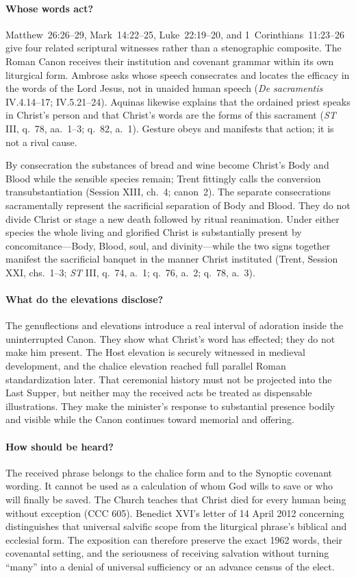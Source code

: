 \paragraph{Whose words act?}
Matthew~26:26--29, Mark~14:22--25, Luke~22:19--20, and 1~Corinthians~11:23--26 give four related scriptural witnesses rather than a stenographic composite. The Roman Canon receives their institution and covenant grammar within its own liturgical form. Ambrose asks whose speech consecrates and locates the efficacy in the words of the Lord Jesus, not in unaided human speech (\emph{De sacramentis} IV.4.14--17; IV.5.21--24). Aquinas likewise explains that the ordained priest speaks in Christ's person and that Christ's words are the forms of this sacrament (\emph{ST} III, q.~78, aa.~1--3; q.~82, a.~1). Gesture obeys and manifests that action; it is not a rival cause.

By consecration the substances of bread and wine become Christ's Body and Blood while the sensible species remain; Trent fittingly calls the conversion transubstantiation (Session XIII, ch.~4; canon~2). The separate consecrations sacramentally represent the sacrificial separation of Body and Blood. They do not divide Christ or stage a new death followed by ritual reanimation. Under either species the whole living and glorified Christ is substantially present by concomitance---Body, Blood, soul, and divinity---while the two signs together manifest the sacrificial banquet in the manner Christ instituted (Trent, Session XXI, chs.~1--3; \emph{ST} III, q.~74, a.~1; q.~76, a.~2; q.~78, a.~3).

\paragraph{What do the elevations disclose?}
The genuflections and elevations introduce a real interval of adoration inside the uninterrupted Canon. They show what Christ's word has effected; they do not make him present. The Host elevation is securely witnessed in medieval development, and the chalice elevation reached full parallel Roman standardization later. That ceremonial history must not be projected into the Last Supper, but neither may the received acts be treated as dispensable illustrations. They make the minister's response to substantial presence bodily and visible while the Canon continues toward memorial and offering.

\paragraph{How should  be heard?}
The received phrase belongs to the chalice form and to the Synoptic covenant wording. It cannot be used as a calculation of whom God wills to save or who will finally be saved. The Church teaches that Christ died for every human being without exception (CCC 605). Benedict XVI's letter of 14 April 2012 concerning  distinguishes that universal salvific scope from the liturgical phrase's biblical and ecclesial form. The exposition can therefore preserve the exact 1962 words, their covenantal setting, and the seriousness of receiving salvation without turning ``many'' into a denial of universal sufficiency or an advance census of the elect.

